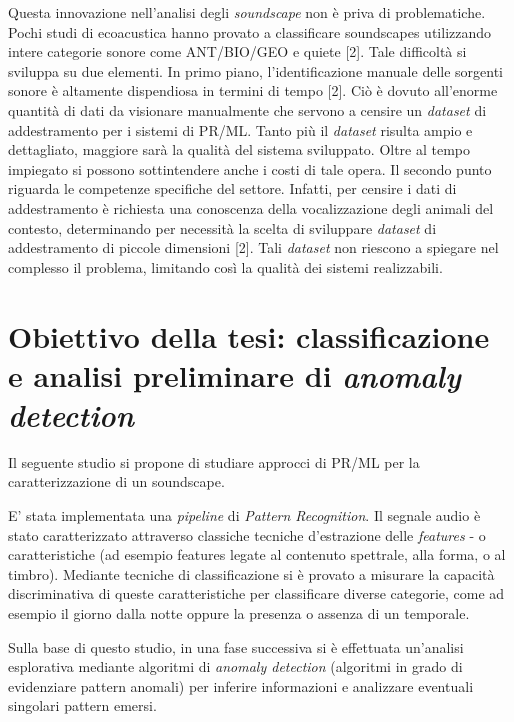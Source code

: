 Questa innovazione nell’analisi degli \textit{soundscape} non è priva di problematiche. Pochi studi di
ecoacustica hanno provato a classificare soundscapes utilizzando intere categorie sonore
come ANT/BIO/GEO e quiete [2]. Tale difficoltà si sviluppa su due elementi. In primo piano,
l’identificazione manuale delle sorgenti sonore è altamente dispendiosa in termini di tempo
[2]. Ciò è dovuto all’enorme quantità di dati da visionare manualmente che servono a censire
un \textit{dataset} di addestramento per i sistemi di PR/ML. Tanto più il \textit{dataset} risulta ampio e
dettagliato, maggiore sarà la qualità del sistema sviluppato. Oltre al tempo impiegato si
possono sottintendere anche i costi di tale opera. Il secondo punto riguarda le competenze
specifiche del settore. Infatti, per censire i dati di addestramento è richiesta una conoscenza
della vocalizzazione degli animali del contesto, determinando per necessità la scelta di
sviluppare \textit{dataset} di addestramento di piccole dimensioni [2]. Tali \textit{dataset} non riescono a
spiegare nel complesso il problema, limitando così la qualità dei sistemi realizzabili.

\section{Obiettivo della tesi: classificazione e analisi preliminare di \textit{anomaly detection}}
Il seguente studio si propone di studiare approcci di PR/ML per la caratterizzazione di un
soundscape.

E’ stata implementata una \textit{pipeline} di \textit{Pattern Recognition}. Il segnale audio è stato
caratterizzato attraverso classiche tecniche d’estrazione delle \textit{features} - o caratteristiche (ad
esempio features legate al contenuto spettrale, alla forma, o al timbro). Mediante tecniche di
classificazione si è provato a misurare la capacità discriminativa di queste caratteristiche per
classificare diverse categorie, come ad esempio il giorno dalla notte oppure la presenza o
assenza di un temporale.

Sulla base di questo studio, in una fase successiva si è effettuata un'analisi esplorativa
mediante algoritmi di \textit{anomaly detection }(algoritmi in grado di evidenziare pattern anomali)
per inferire informazioni e analizzare eventuali singolari pattern emersi.
